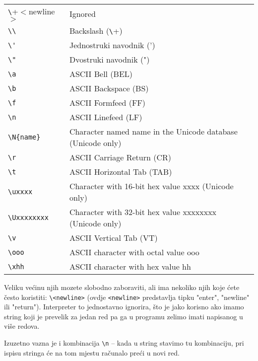 	{\normalsize
	\begin{tabular}{ll}
		\verb+\+$<$newline$>$ & Ignored \\
		\verb+\\+ & Backslash (\verb+\+) \\
		\verb+\'+ & Jednostruki navodnik (') \\
		\verb+\"+ & Dvostruki navodnik (") \\
		\verb+\a+ & ASCII Bell (BEL)\\
		\verb+\b+ & ASCII Backspace (BS)\\
		\verb+\f+ & ASCII Formfeed (FF)\\
		\verb+\n+ & ASCII Linefeed (LF)\\
		\verb+\N{name}+ & Character named name in the Unicode database (Unicode only)\\
		\verb+\r+ & ASCII Carriage Return (CR)\\
		\verb+\t+ & ASCII Horizontal Tab (TAB)\\
		\verb+\uxxxx+ & Character with 16-bit hex value xxxx (Unicode only)\\
		\verb+\Uxxxxxxxx+ & Character with 32-bit hex value xxxxxxxx (Unicode only)\\
		\verb+\v+ & ASCII Vertical Tab (VT)\\
		\verb+\ooo+ & ASCII character with octal value ooo\\
		\verb+\xhh+ & ASCII character with hex value hh\\
	\end{tabular}
	}

	\vspace{2mm}
Veliku većinu njih mozete slobodno zaboraviti, ali ima
nekoliko njih koje ćete često koristiti: \verb+\<newline>+
(ovdje \verb+<newline>+ predstavlja tipku "enter", "newline" ili
"return"). Interpreter to jednostavno ignorira, što je jako
korisno ako imamo string koji je prevelik za jedan red pa ga u
programu zelimo imati napisanog u više redova.

Izuzetno vazna je i kombinacija \verb+\n+ -- kada u string
stavimo tu kombinaciju, pri ispisu stringa će na tom mjestu
računalo preći u novi red.


